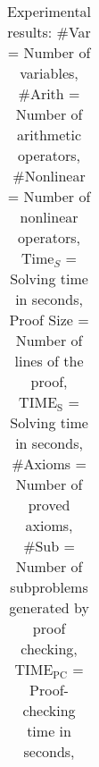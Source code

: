 \begin{table}[h]
\begin{center}
\begin{tabular}{l||r|r|r|r||r|r|r|r}
    \end{tabular}
  \end{center}
  \caption{
    Experimental results:
    \#Var = Number of variables,
    \#Arith = Number of arithmetic operators,
    \#Nonlinear = Number of nonlinear operators,
    Time$_S$ = Solving time in seconds,
    Proof Size = Number of lines of the proof,
    $\mathrm{TIME_S}$ = Solving time in seconds,
    \#Axioms = Number of proved axioms,
    \#Sub = Number of subproblems generated by proof checking,
    $\mathrm{TIME_{PC}}$ = Proof-checking time in seconds,
  }\label{tbl:exp}
\end{table}


